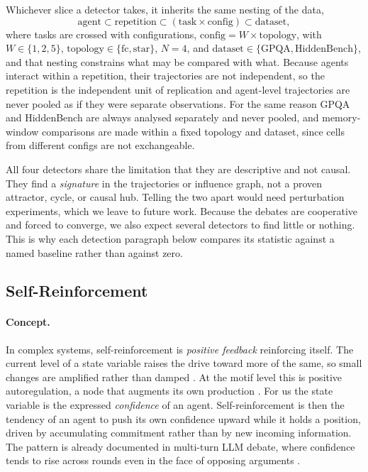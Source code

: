 Whichever slice a detector takes, it inherits the same nesting of the data,
\begin{equation}
  \text{agent} \subset \text{repetition} \subset
  (\text{task} \times \text{config}) \subset \text{dataset},
\end{equation}
where tasks are crossed with configurations, $\text{config} = W \times \text{topology}$,
with $W \in \{1,2,5\}$, $\text{topology} \in \{\text{fc}, \text{star}\}$, $N = 4$,
and $\text{dataset} \in \{\text{GPQA}, \text{HiddenBench}\}$, and that nesting
constrains what may be compared with what. Because agents interact within a
repetition, their trajectories are not independent, so the repetition is the
independent unit of replication and agent-level trajectories are never pooled as
if they were separate observations. For the same reason GPQA
and HiddenBench are always analysed separately and never pooled, and memory-window
comparisons are made within a fixed topology and dataset, since cells from
different configs are not exchangeable.

All four detectors share the limitation that they are descriptive and not causal. 
They find a
\emph{signature} in the trajectories or influence graph, not a proven attractor,
cycle, or causal hub. Telling the two apart would need perturbation experiments,
which we leave to future work. Because the debates are cooperative and forced to
converge, we also expect several detectors to find little or nothing. This is why
each detection paragraph below compares its statistic against a named baseline
rather than against zero.

\subsection{Self-Reinforcement}
\label{sec:method:sr}

\paragraph{Concept.}
In complex systems, self-reinforcement is \emph{positive feedback} reinforcing itself. 
The current
level of a state variable raises the drive toward more of the same, so small changes
are amplified rather than damped \citep{arthur1989competing}. At the motif level
this is positive autoregulation, a node that augments its own production
\citep{alon2007network}. For us the state variable is the expressed
\emph{confidence} of an agent. Self-reinforcement is then the tendency of an agent
to push its own confidence upward while it holds a position, driven by
accumulating commitment rather than by new incoming information. The
pattern is already documented in multi-turn \ac{LLM} debate, where confidence tends to rise
across rounds even in the face of opposing arguments \citep{prasad2025certain}.

